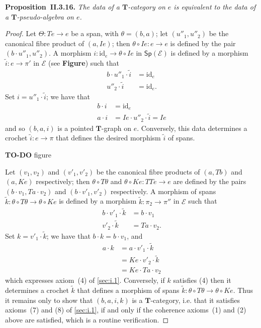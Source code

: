 \documentclass[fleqn]{article}
\newenvironment{itenv}[1]
  {\phantomsection\par\medskip\noindent\textbf{#1.}\itshape}
  {\par\medskip}
\newcommand{\oldpage}[1]{\marginpar{\footnotesize$\Big\vert$ \textit{p.~#1}}}
\newcommand{\todo}{{\color{purple}\textbf{TO-DO }}}
\newcommand{\unsure}[1]{{\color{purple}\textbf{#1}}}
\newcommand{\id}{\mathrm{id}}
\newcommand{\TT}{\mathbf{T}}
\newcommand{\cat}[1]{\mathcal{#1}}
\newcommand{\Cat}[1]{\mathsf{#1}}
\newcommand{\Sp}[1]{\Cat{Sp}(#1)}
\begin{document}
\begin{itenv}{Proposition~II.3.16}
  The data of a $\TT$-category on $e$ is equivalent to the data of a $\TT$-pseudo-algebra on $e$.
\end{itenv}

\begin{proof}
  Let $\Theta\colon Te\to e$ be a span, with $\theta=(b,a)$;
  let $(u''_1,u''_2)$ be the canonical fibre product of $(a,Ie)$;
  then $\theta\circ Ie\colon e\to e$ is defined by the pair $(b\cdot u''_1,u''_2)$.
  A morphism $i\colon\id_e\to\theta\circ Ie$ in $\Sp{\cat{E}}$ is defined by a morphism $\tilde{i}\colon e\to\pi'$ in $\cat{E}$ (see \unsure{Figure}) such that
  \[
    \begin{aligned}
      b\cdot u''_1\cdot\tilde{i}
      &= \id_e
    \\u''_2\cdot\tilde{i}
      &= \id_e.
    \end{aligned}
  \]
  Set $i=u''_1\cdot\tilde{i}$;
  we have that
  \[
    \begin{aligned}
      b\cdot i
      &= \id_e
    \\a\cdot i
      &= Ie\cdot u''_2\cdot\tilde{i}
      = Ie
    \end{aligned}
  \]
  and so $(b,a,i)$ is a pointed $\TT$-graph on $e$.
  Conversely, this data determines a crochet $\tilde{i}\colon e\to\pi$ that defines the desired morphism $\tilde{i}$ of spans.

  \todo{figure}

  \oldpage{261}
  Let $(v_1,v_2)$ and $(v'_1,v'_2)$ be the canonical fibre products of $(a,Tb)$ and $(a,Ke)$ respectively;
  then $\theta\circ T\theta$ and $\theta\circ Ke\colon TTe\to e$ are defined by the pairs $(b\cdot v_1,Ta\cdot v_2)$ and $(b\cdot v'_1,v'_2)$ respectively.
  A morphism of spans $\tilde{k}\colon\theta\circ T\theta\to\theta\circ Ke$ is defined by a morphism $\tilde{k}\colon\pi_2\to\pi''$ in $\cat{E}$ such that
  \[
    \begin{aligned}
      b\cdot v'_1\cdot\tilde{k}
      &= b\cdot v_1
    \\v'_2\cdot\tilde{k}
      &= Ta\cdot v_2.
    \end{aligned}
  \]
  Set $k=v'_1\cdot\tilde{k}$;
  we have that $b\cdot k=b\cdot v_1$, and
  \[
    \begin{aligned}
      a\cdot k
      &= a\cdot v'_1\cdot\tilde{k}
    \\&= Ke\cdot v'_2\cdot\tilde{k}
    \\&= Ke\cdot Ta\cdot v_2
    \end{aligned}
  \]
  which expresses axiom~(4) of \cref{sec:i.1}.
  Conversely, if $k$ satisfies (4) then it determines a crochet $\tilde{k}$ that defines a morphism of spans $\tilde{k}\colon\theta\circ T\theta\to\theta\circ Ke$.
  Thus it remains only to show that $(b,a,i,k)$ is a $\TT$-category, i.e. that it satisfies axioms~(7) and (8) of \cref{sec:i.1}, if and only if the coherence axioms~(1) and (2) above are satisfied, which is a routine verification.
\end{proof}
\end{document}
